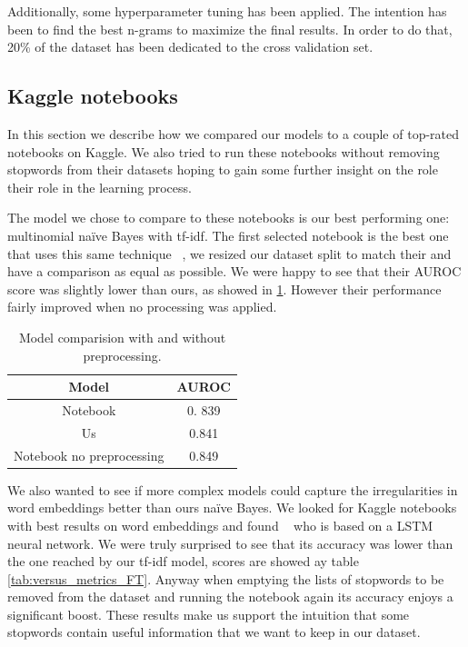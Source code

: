 Additionally, some hyperparameter tuning has been applied.
The intention has been to find the best n-grams to maximize the final results.
In order to do that, 20\% of the dataset has been dedicated to the cross validation set.

\subsection*{Kaggle notebooks}

In this section we describe how we compared our models to a couple of top-rated notebooks on Kaggle.
We also tried to run these notebooks without removing stopwords from their datasets hoping to gain some further insight on the role their role in the learning process. 

The model we chose to compare to these notebooks is our best performing one: multinomial na\"ive Bayes with tf-idf. 
The first selected notebook is the best one that uses this same technique ~\cite{startups:notebook1}, we resized our dataset split to match their and have a comparison as equal as possible.
We were happy to see that their AUROC score was slightly lower than ours, as showed in \ref{tab:versus_metrics_NB}.
However their performance fairly improved when no processing was applied.

\begin{table}[h!t]
    \centering
    \caption{Model comparision with and without preprocessing.}
    \label{tab:versus_metrics_NB}
    \begin{tabular}{c|c}
        \hline
        Model & AUROC \\
        \hline 
        Notebook & 0. 839 \\ 
        Us & 0.841 \\ 
        Notebook no preprocessing & 0.849 \\ 
        \hline
    \end{tabular}
\end{table}

We also wanted to see if more complex models could capture the irregularities in word embeddings better than ours na\"ive Bayes. 
We looked for Kaggle notebooks with best results on word embeddings and found ~\cite{startups:notebook2} who is based on a LSTM neural network.
We were truly surprised to see that its accuracy was lower than the one reached by our tf-idf model, scores are showed ay table \ref{tab:versus_metrics_FT}. 
Anyway when emptying the lists of stopwords to be removed from the dataset and running the notebook again its accuracy enjoys a significant boost. 
These results make us support the intuition that some stopwords contain useful information that we want to keep in our dataset. 

